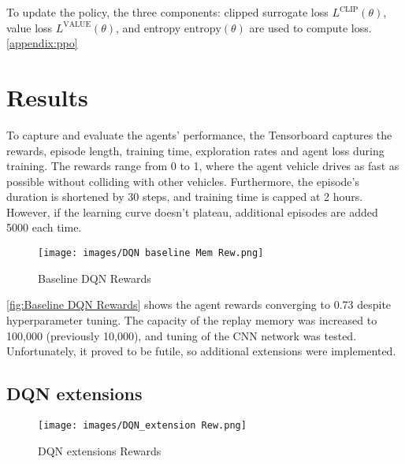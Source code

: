 \documentclass{article}
\begin{document}

To update the policy, the three components: clipped surrogate loss $L^{\text{CLIP}}(\theta)$, value loss $L^{\text{VALUE}}(\theta)$, and entropy $\text{entropy}(\theta)$ are used to compute loss. \ref{appendix:ppo}




\section{Results}


To capture and evaluate the agents' performance, the Tensorboard captures the rewards, episode length, training time, exploration rates and agent loss during training.
The rewards range from 0 to 1, where the agent vehicle drives as fast as possible without colliding with other vehicles. Furthermore, the episode's duration is shortened by 30 steps, and training time is capped at 2 hours. However, if the learning curve doesn’t plateau, additional episodes are added 5000 each time.

\begin{figure}[h]
    \centering
    \begin{minipage}{\textwidth}
        \centering
        \texttt{[image: images/DQN baseline Mem Rew.png]}
        \caption{Baseline DQN Rewards}
        \label{fig:Baseline DQN Rewards}
    \end{minipage}
\end{figure}
\autoref{fig:Baseline DQN Rewards} shows the agent rewards converging to 0.73 despite hyperparameter tuning.
The capacity of the replay memory was increased to 100,000 (previously 10,000), and tuning of the CNN network was tested. Unfortunately, it proved to be futile, so additional extensions were implemented.

\subsection{DQN extensions}
\begin{figure}[h]
    \centering
    \texttt{[image: images/DQN\_extension Rew.png]}
    \caption{DQN extensions Rewards}
    \label{fig:DQN extensions}
\end{figure}
\end{document}
